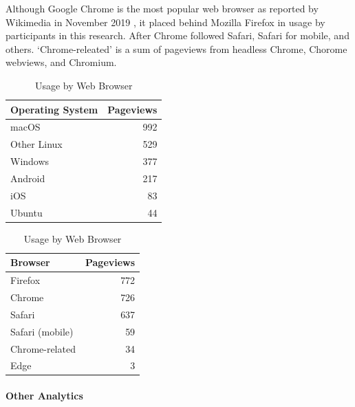 \documentclass{article}
\begin{document}
Although Google Chrome is the most popular web browser as reported by Wikimedia in November 2019 \cite{noauthor_dashiki:_nodate}, it placed behind Mozilla Firefox in usage by participants in this research. After Chrome followed Safari, Safari for mobile, and others. `Chrome-releated' is a sum of pageviews from headless Chrome, Chorome webviews, and Chromium.

\begin{table}[!htb]
	\begin{minipage}{.5\linewidth}
		\caption{Usage by Operating System}
		\centering
		\begin{tabular}{lr}
			\hline
			\textbf{Operating System} & \textbf{Pageviews} \\
			\hline
			macOS                     & 992                \\
			Other Linux               & 529                \\
			Windows                   & 377                \\
			Android                   & 217                \\
			iOS                       & 83                 \\
			Ubuntu                    & 44                 \\
			\hline
		\end{tabular}
	\end{minipage}%
	\hspace{.1cm}
	\begin{minipage}{.5\linewidth}
		\centering
		\caption{Usage by Web Browser}
		\begin{tabular}{lr}
			\hline
			\textbf{Browser} & \textbf{Pageviews} \\
			\hline
			Firefox          & 772                \\
			Chrome           & 726                \\
			Safari           & 637                \\
			Safari (mobile)  & 59                 \\
			Chrome-related   & 34                 \\
			Edge             & 3                  \\
			\hline
		\end{tabular}
	\end{minipage} 
\end{table}

\paragraph{Other Analytics}
\end{document}
